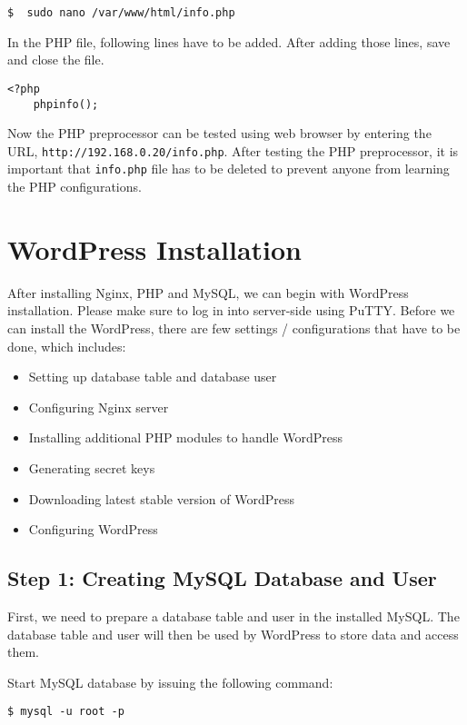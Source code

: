 \begin{lstlisting}
$  sudo nano /var/www/html/info.php
\end{lstlisting}

In the PHP file, following lines have to be added. After adding those lines, save and close the file.
\begin{lstlisting}
<?php
    phpinfo();
\end{lstlisting}

Now the PHP preprocessor can be tested using web browser by entering the URL, \texttt{http://192.168.0.20/info.php}. After testing the PHP preprocessor, it is important that \texttt{info.php} file has to be deleted to prevent anyone from learning the PHP configurations.

\section{WordPress Installation} \label{sec:wordpress-installation}
After installing Nginx, PHP and MySQL, we can begin with WordPress installation. Please make sure to log in into server-side using PuTTY. Before we can install the WordPress, there are few settings / configurations that have to be done, which includes:
\begin{itemize}
\item Setting up database table and database user
\item Configuring Nginx server
\item Installing additional PHP modules to handle WordPress
\item Generating secret keys
\item Downloading latest stable version of WordPress
\item Configuring WordPress
\end{itemize}

\subsection*{Step 1: Creating MySQL Database and User}

First, we need to prepare a database table and user in the installed MySQL. The database table and user will then be used by WordPress to store data and access them.

Start MySQL database by issuing the following command:

\begin{lstlisting}
$ mysql -u root -p
\end{lstlisting}

